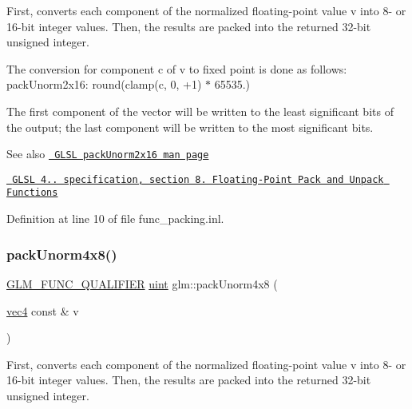 First, converts each component of the normalized floating-\/point value v into 8-\/ or 16-\/bit integer values. Then, the results are packed into the returned 32-\/bit unsigned integer.

The conversion for component c of v to fixed point is done as follows\+: pack\+Unorm2x16\+: round(clamp(c, 0, +1) $\ast$ 65535.)

The first component of the vector will be written to the least significant bits of the output; the last component will be written to the most significant bits.

\begin{DoxySeeAlso}{See also}
\href{http://www.opengl.org/sdk/docs/manglsl/xhtml/packUnorm2x16.xml}{\texttt{ G\+L\+SL pack\+Unorm2x16 man page}} 

\href{http://www.opengl.org/registry/doc/GLSLangSpec.4.20.8.pdf}{\texttt{ G\+L\+SL 4.. specification, section 8. Floating-\/\+Point Pack and Unpack Functions}} 
\end{DoxySeeAlso}


Definition at line 10 of file func\+\_\+packing.\+inl.

\mbox{\label{group__core__func__packing_ga834ee9a9e73dcb0a7c1fc88143f3edb8}} 
\subsubsection{\texorpdfstring{packUnorm4x8()}{packUnorm4x8()}}
{\footnotesize\ttfamily \mbox{\hyperlink{setup_8hpp_a33fdea6f91c5f834105f7415e2a64407}{G\+L\+M\+\_\+\+F\+U\+N\+C\+\_\+\+Q\+U\+A\+L\+I\+F\+I\+ER}} \mbox{\hyperlink{group__core__precision_ga4fd29415871152bfb5abd588334147c8}{uint}} glm\+::pack\+Unorm4x8 (\begin{DoxyParamCaption}\item[{\mbox{\hyperlink{group__core__types_ga5881b1b022d7fd1b7218f5916532dd02}{vec4}} const \&}]{v }\end{DoxyParamCaption})}

First, converts each component of the normalized floating-\/point value v into 8-\/ or 16-\/bit integer values. Then, the results are packed into the returned 32-\/bit unsigned integer.

